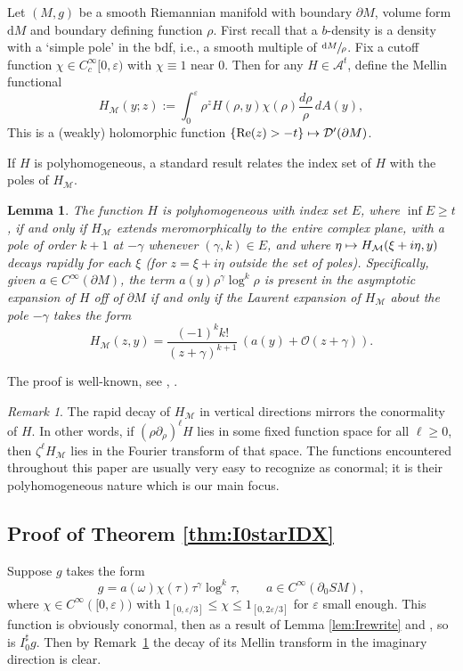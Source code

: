 \documentclass[11pt]{article}
\newcommand{\ie}{i.e.,\xspace}
\newcommand{\Subsection}{\subsection}
\let\cal\mathcal
\let\epsilon\varepsilon
\def\mto{\mathchoice{\longmapsto}{\mapsto}{\mapsto}{\mapsto}}
\DeclareMathOperator{\Real}{Re}
\theoremstyle{plain}
\newtheorem{Lemma}[Theorem]{Lemma}
\theoremstyle{definition}
\theoremstyle{remark}
\newtheorem{Remark}[Theorem]{Remark}
\def\A{\mathcal{A}}
\def\D{\mathcal{D}}
\newcommand{\adj}{I_0^\sharp}
\newcommand {\dM}{\mathrm{d}M}
\begin{document}
Let $(M,g)$ be a smooth Riemannian manifold with boundary $\partial M$, volume form $\dM$ and boundary defining function $\rho$. First recall that a $b$-density is a density with a `simple pole' in the bdf, \ie a smooth multiple of $\sfrac{\dM}{\rho}$.
Fix a cutoff function $\chi \in C_c^\infty[0,\varepsilon)$ with $\chi\equiv 1$ near $0$. Then for any $H \in \A^t$, define the Mellin functional
\begin{equation*}
H_{\cal M}(y; z) := \int_0^\varepsilon \rho^z H(\rho,y)\chi(\rho) \frac{d\rho}{\rho}\,dA(y),
\end{equation*}
This is a (weakly) holomorphic function $\{\Real(z)>-t\} \mto \D^\prime (\partial M)$.

If $H$ is polyhomogeneous, a standard result relates the index set of $H$ with the poles of $H_{\cal M}$.
\begin{Lemma}\label{lem:Mellin}
The function $H$ is polyhomogeneous with index set $E$, where $\inf E \geq t$, if and only if $H_{\cal M}$ extends meromorphically to the entire complex plane, with a pole of order $k+1$ at $-\gamma$
whenever $(\gamma,k)\in E$, and where $\eta \mto H_{\cal M}(\xi + i\eta, y)$ decays rapidly for each $\xi$ (for $z = \xi + i\eta$ outside the set of poles). Specifically, given $a\in C^\infty(\partial M)$, the term $a(y) \rho^\gamma \log^k \rho$ is present in the asymptotic expansion of $H$ off of $\partial M$ if and only if the Laurent expansion of $H_{\cal M}$ about the pole $-\gamma$ takes the form
\[
H_{\cal M}(z,y) = \frac{(-1)^k k!}{(z+\gamma)^{k+1}}\, (a(y) + {\cal O} (z+\gamma)).
\]
\end{Lemma}

The proof is well-known, see \cite{Melrose1992}, \cite[App.\,A]{Mazzeo1991}.

\begin{Remark}
The rapid decay of $H_{\cal M}$ in vertical directions mirrors the conormality of $H$. In other words, if $(\rho\partial_\rho)^\ell H$ lies in some
fixed function space for all $\ell \geq 0$, then $\zeta^\ell H_{\cal M}$ lies in the Fourier transform of that space. The functions encountered
throughout this paper are usually very easy to recognize as conormal; it is their polyhomogeneous nature which is our main focus.
\label{decay}
\end{Remark}

\Subsection{Proof of Theorem \ref{thm:I0starIDX}} \label{sec:proofbackprojection}
Suppose $g$ takes the form
\begin{equation*}
g = a(\omega) \chi(\tau) \tau^\gamma \log^k \tau, \qquad a\in C^\infty(\partial_0 SM),
\end{equation*}
where $\chi\in C^\infty([0,\epsilon))$ with $1_{[0,\epsilon/3]} \le \chi \le 1_{[0,2\epsilon/3]}$ for $\epsilon$ small enough. This function is obviously conormal, then as a result of Lemma \ref{lem:Irewrite} and \cite[Th.\,3 \& 5]{Melrose1992}, so is $\adj g$. Then by Remark~\ref{decay} the decay of its Mellin transform in the imaginary direction is clear.
\end{document}
